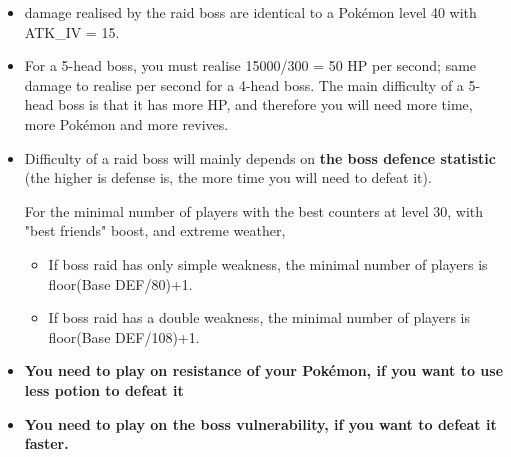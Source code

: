 \documentclass[12pt]{beamer}
\begin{document}
\begin{frame}
\begin{block}{}
\begin{footnotesize}
\begin{itemize}
   \item damage realised by the raid boss are identical to a Pok\'emon level 40 with ATK\_IV = 15.
  \item For a 5-head boss, you must realise 15000/300 = 50 HP per second; same damage to realise per second for a 4-head boss. The main difficulty of a 5-head boss is that it has more HP, and therefore you will need more time, more Pok\'emon and more revives.
  \item Difficulty of a raid boss will mainly depends on \textbf{the boss defence statistic} (the higher is defense is, the more time you will need to defeat it).


For the minimal number of players with the best counters at level 30, with "best friends" boost, and extreme weather, 
\begin{itemize}
  \item \footnotesize If boss raid has only simple weakness, the minimal number of players is floor(Base DEF/80)+1.
  \item \footnotesize If boss raid has a double weakness, the minimal number of players is floor(Base DEF/108)+1.
\end{itemize}
  
  \item \textbf{You need to play on resistance of your Pok\'emon, if you want to use less potion to defeat it}
  \item \textbf{You need to play on the boss vulnerability, if you want to defeat it faster.}
\end{itemize}

\end{footnotesize}
\end{block}
\end{frame}
\end{document}
